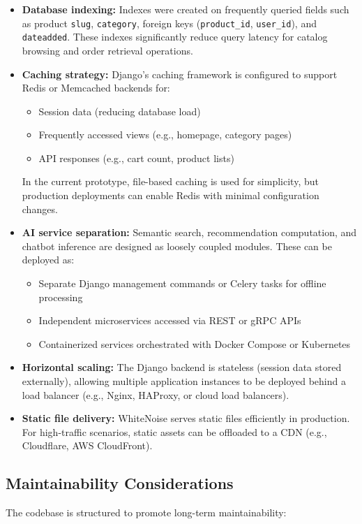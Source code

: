 \begin{itemize}
  \item \textbf{Database indexing:} Indexes were created on frequently queried fields such as product \texttt{slug}, \texttt{category}, foreign keys (\texttt{product\_id}, \texttt{user\_id}), and \texttt{dateadded}. These indexes significantly reduce query latency for catalog browsing and order retrieval operations.
  
  \item \textbf{Caching strategy:} Django's caching framework is configured to support Redis or Memcached backends for:
  \begin{itemize}
    \item Session data (reducing database load)
    \item Frequently accessed views (e.g., homepage, category pages)
    \item API responses (e.g., cart count, product lists)
  \end{itemize}
  In the current prototype, file-based caching is used for simplicity, but production deployments can enable Redis with minimal configuration changes.
  
  \item \textbf{AI service separation:} Semantic search, recommendation computation, and chatbot inference are designed as loosely coupled modules. These can be deployed as:
  \begin{itemize}
    \item Separate Django management commands or Celery tasks for offline processing
    \item Independent microservices accessed via REST or gRPC APIs
    \item Containerized services orchestrated with Docker Compose or Kubernetes
  \end{itemize}
  
  \item \textbf{Horizontal scaling:} The Django backend is stateless (session data stored externally), allowing multiple application instances to be deployed behind a load balancer (e.g., Nginx, HAProxy, or cloud load balancers).
  
  \item \textbf{Static file delivery:} WhiteNoise serves static files efficiently in production. For high-traffic scenarios, static assets can be offloaded to a CDN (e.g., Cloudflare, AWS CloudFront).
\end{itemize}

\subsection*{Maintainability Considerations}
The codebase is structured to promote long-term maintainability:

